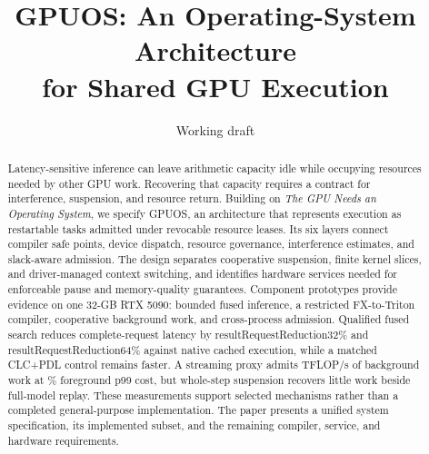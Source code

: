 \documentclass[letterpaper,twocolumn,10pt]{article}
\date{}
\title{\Large\bf GPUOS: An Operating-System Architecture\\for Shared GPU Execution}
\author{\rm Working draft}
\newcommand{\res}[1]{\csname result#1\endcsname}
\begin{document}
\maketitle
\begin{abstract}
Latency-sensitive inference can leave arithmetic capacity idle while occupying
resources needed by other GPU work. Recovering that capacity requires a
contract for interference, suspension, and resource return. Building on
\emph{The GPU Needs an Operating System}, we specify GPUOS, an architecture
that represents execution as restartable tasks admitted under revocable
resource leases. Its six layers connect compiler safe points, device dispatch,
resource governance, interference estimates, and slack-aware admission.
The design separates cooperative suspension, finite kernel slices, and
driver-managed context switching, and identifies hardware services needed
for enforceable pause and memory-quality guarantees.
Component prototypes provide evidence on one 32-GB RTX 5090: bounded fused
inference, a restricted FX-to-Triton compiler, cooperative background work,
and cross-process admission. Qualified fused search reduces complete-request
latency by \res{RequestReduction32}\% and \res{RequestReduction64}\%
against native cached execution, while a matched CLC+PDL control remains
faster. A streaming proxy admits \slackProxyMediumRate{} TFLOP/s of background
work at \slackProxyMediumCost\% foreground p99 cost, but whole-step suspension
recovers little work beside full-model replay. These measurements support
selected mechanisms rather than a completed general-purpose implementation.
The paper presents a unified system specification, its implemented subset,
and the remaining compiler, service, and hardware requirements.
\end{abstract}






\label{page:bodyend}
\clearpage


\end{document}
